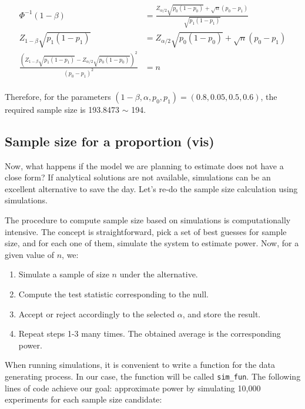 \documentclass[]{book}
\begin{document}
\begin{align*}
\Phi^{-1}(1 - \beta)& = \frac{Z_{\alpha/2}\sqrt{p_0(1-p_0)} + \sqrt{n}(p_0 - p_1)}{\sqrt{p_1(1-p_1)}} \\
Z_{1-\beta}\sqrt{p_1(1-p_1)}& = Z_{\alpha/2}\sqrt{p_0(1-p_0)} + \sqrt{n}(p_0 - p_1) \\
\frac{\left(Z_{1-\beta}\sqrt{p_1(1-p_1)} - Z_{\alpha/2}\sqrt{p_0(1-p_0)}\right)^2}{(p_0 - p_1)^2}& = n \\
\end{align*}

Therefore, for the parameters \((1-\beta, \alpha, p_0, p_1) = (0.8, 0.05, 0.5, 0.6)\), the required sample size is 193.8473 \(\sim\) 194.

\hypertarget{sample-size-for-a-proportion-vis}{%
\subsection{Sample size for a proportion (vis)}\label{sample-size-for-a-proportion-vis}}

Now, what happens if the model we are planning to estimate does not have a close form? If analytical solutions are not available, simulations can be an excellent alternative to save the day. Let's re-do the sample size calculation using simulations.

The procedure to compute sample size based on simulations is computationally intensive. The concept is straightforward, pick a set of best guesses for sample size, and for each one of them, simulate the system to estimate power. Now, for a given value of \(n\), we:

\begin{enumerate}
\def\labelenumi{\arabic{enumi}.}
\item
  Simulate a sample of size \(n\) under the alternative.
\item
  Compute the test statistic corresponding to the null.
\item
  Accept or reject accordingly to the selected \(\alpha\), and store the result.
\item
  Repeat steps 1-3 many times. The obtained average is the corresponding power.
\end{enumerate}

When running simulations, it is convenient to write a function for the data generating process. In our case, the function will be called \texttt{sim\_fun}. The following lines of code achieve our goal: approximate power by simulating 10,000 experiments for each sample size candidate:
\end{document}
